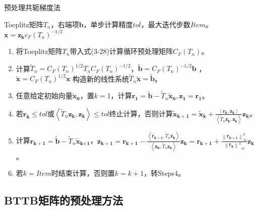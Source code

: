 \documentclass[twoside,UTF8]{nputhesis}
\begin{document}
\begin{algorithm}
	\caption{预处理共轭梯度法}      %
	\begin{algorithmic} %
		\renewcommand{\algorithmicrequire}{\textbf{Input:}}
		\renewcommand{\algorithmicensure}{\textbf{Output:}}
	
		\REQUIRE Toeplitz矩阵${{T}_{n}}$，右端项$\bm{b}$，单步计算精度$tol$，最大迭代步数$Item$。    %
		\ENSURE $\bm{x}=\bm{{{z}_{k}}}{{c}_{F}}{{({{T}_{n}})}^{-1/2}}$                    %
		\	
		\begin{enumerate}[Step 1:]
			\item 将Toeplitz矩阵${{T}_{n}}$带入式(3-28)计算循环预处理矩阵${{C}_{F}}({{T}_{n}})$。
			\item 计算${{\tilde{T}}_{n}}={{C}_{F}}{{({{T}_{n}})}^{1/2}}{{T}_{n}}{{C}_{F}}{{({{T}_{n}})}^{-1/2}}$，$\bm{\tilde{b}}={{C}_{F}}{{({{T}_{n}})}^{-1/2}}\bm{b}$ ，$\bm{\tilde{x}}={{C}_{F}}{{({{T}_{n}})}^{1/2}}\bm{x}$ 构造新的线性系统${{\tilde{T}}_{n}}\bm{\tilde{x}}=\bm{\tilde{b}}$。
			\item
			任意给定初始向量$\bm{{\tilde{x}}_{0}}$，置$k=1$，计算$\bm{{r}_{1}}=\bm{\tilde{b}}-{{\tilde{T}}_{n}}\bm{{\tilde{x}}_{0}},\bm{{z}_{1}}=\bm{{r}_{1}}$。
			\item
			若$\bm{{r}_{k}}\le tol$或$\left< {{{\tilde{T}}}_{n}}\bm{{z}_{k}},\bm{{z}_{k}} \right>\le tol$终止计算，否则计算$\bm{{\tilde{x}}_{k+1}}=\bm{{\tilde{x}}_{k}}+\frac{\left<\bm{{r}_{k}},\bm{{z}_{k}}\right>}{\left<{{{\tilde{T}}}_{n}}\bm{{z}_{k}},\bm{{z}_{k}}\right>}\bm{{z}_{k}}$。
			\item
			计算$\bm{{r}_{k+1}}=\bm{\tilde{b}}-{{\tilde{T}}_{n}}\bm{{\tilde{x}}_{\text{k+1}}}$，$\bm{{z}_{k+1}}=\bm{{r}_{k+1}}-\frac{\left<\bm{{r}_{k+1}},{{{\tilde{T}}}_{n}}\bm{{z}_{k}}\right>}{\left<\bm{{z}_{k}},{{{\tilde{T}}}_{n}}\bm{{z}_{k}}\right>}\bm{{z}_{k}}=\bm{{r}_{k+1}}+\frac{{{\left\| \bm{{r}_{k+1}} \right\|}^{2}_{\infty}}}{{{\left\| \bm{{r}_{k}} \right\|}^{2}}_{\infty}}\bm{{z}_{k}}$。
			\item
			若$k=Item$时结束计算，否则置$k=k+1$，转Steps4。	
		\end{enumerate}		
	\end{algorithmic}
\end{algorithm}


\subsection{BTTB矩阵的预处理方法}
\noindent
\end{document}
